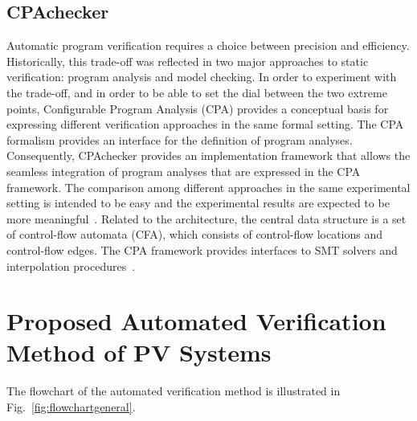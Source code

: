 \documentclass[review]{elsarticle}
\begin{document}
\subsection{CPAchecker}
Automatic program verification requires a choice between precision and efficiency. %
Historically, this trade-off was reflected in two major approaches to static verification: program analysis and model checking. In order to experiment with the trade-off, and in order to be able to set the dial between the two extreme points, Configurable Program Analysis (CPA) provides a conceptual basis for expressing different verification approaches in the same formal setting. The CPA formalism provides an interface for the definition of program analyses. Consequently, CPAchecker provides an implementation framework that allows the seamless integration of program analyses that are expressed in the CPA framework. The comparison among different approaches in the same experimental setting is intended to be easy and the experimental results are expected to be more meaningful~\citep{Beyer2011}. Related to the architecture, the central data structure is a set of control-flow automata (CFA), which consists of control-flow locations and control-flow edges. The CPA framework provides interfaces to SMT solvers and interpolation procedures~\citep{Beyer2011}. %
%
%
\section{Proposed Automated Verification Method of PV Systems}
\label{sec:Methodology}
%
%
%
%
The flowchart of the automated verification method is illustrated in Fig.~\ref{fig:flowchartgeneral}. 
\end{document}
